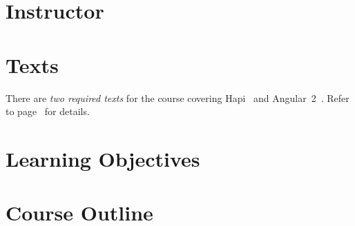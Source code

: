 \documentclass[11pt]{article}
\begin{document}
\section{Instructor}



\section{Texts}

There are \emph{two required texts} for the course
covering Hapi~\cite{hapijs} and Angular~2~\cite{angular2}.
Refer to page~\pageref{sec:references}
for details.

\section{Learning Objectives}

\section{Course Outline}
\end{document}
